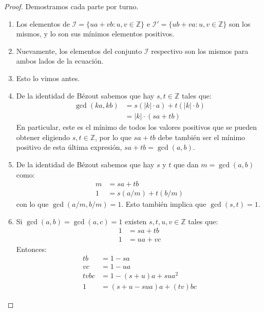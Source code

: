   \begin{proof}
    Demostramos cada parte por turno.
    \begin{enumerate}
    \item
      Los elementos de
      \(\mathcal{I} = \{u a + v b \colon u, v \in \mathbb{Z}\}\)
      e \(\mathcal{I}' = \{u b + v a \colon u, v \in \mathbb{Z}\}\)
      son los mismos,
      y lo son sus mínimos elementos positivos.
    \item
      Nuevamente,
      los elementos del conjunto \(\mathcal{I}\) respectivo
      son los mismos para ambos lados de la ecuación.
    \item
      Esto lo vimos antes.
    \item
      De la identidad de Bézout%
      sabemos que hay \(s, t \in \mathbb{Z}\)
      tales que:
      \begin{align*}
	\gcd(k a, k b)
	  &= s (\lvert k  \rvert \cdot a)
	       + t (\lvert k  \rvert \cdot b) \\
	  &= \lvert k  \rvert \cdot (s a + t b)
      \end{align*}
      En particular,
      este es el mínimo de todos los valores positivos
      que se pueden obtener eligiendo \(s, t \in \mathbb{Z}\),
      por lo que \(s a + t b\)
      debe también ser el mínimo positivo de esta última expresión,
      \(s a + t b = \gcd(a, b)\).
    \item
      De la identidad de Bézout
      sabemos que hay \(s\) y \(t\) que dan \(m = \gcd(a, b)\) como:
      \begin{align*}
	m &= s a + t b \\
	1 &= s (a / m) + t (b / m)
      \end{align*}
      con lo que \(\gcd(a / m, b / m) = 1\).
      Esto también implica que \(\gcd(s, t) = 1\).
    \item
      Si \(\gcd(a, b) = \gcd(a, c) = 1\)
      existen \(s, t, u, v \in \mathbb{Z}\)
      tales que:
      \begin{align*}
	1 &= s a + t b \\
	1 &= u a + v c
      \end{align*}
      Entonces:
      \begin{align*}
	t b
	  &= 1 - s a \\
	v c
	  &= 1 - u a \\
	t v b c
	  &= 1 - (s + u) a + su a^2 \\
	1
	  &= (s + u - s u a) a + (t v) b c
      \end{align*}

\end{enumerate}
\end{proof}
